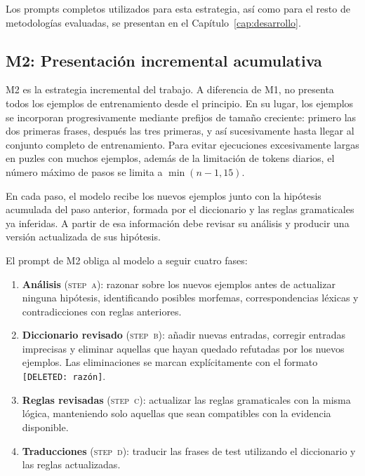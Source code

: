 Los prompts completos utilizados para esta estrategia, así como para el resto de metodologías evaluadas, se presentan en el Capítulo~\ref{cap:desarrollo}.

\subsection{M2: Presentación incremental acumulativa}
\label{subsec:incremental}

M2 es la estrategia incremental del trabajo. A diferencia de M1, no presenta todos los ejemplos de entrenamiento desde el principio. En su lugar, los ejemplos se incorporan progresivamente mediante prefijos de tamaño creciente: primero las dos primeras frases, después las tres primeras, y así sucesivamente hasta llegar al conjunto completo de entrenamiento. Para evitar ejecuciones excesivamente largas en puzles con muchos ejemplos, además de la limitación de tokens diarios, el número máximo de pasos se limita a $\min(n-1, 15)$.

En cada paso, el modelo recibe los nuevos ejemplos junto con la hipótesis acumulada del paso anterior, formada por el diccionario y las reglas gramaticales ya inferidas. A partir de esa información debe revisar su análisis y producir una versión actualizada de sus hipótesis.

El prompt de M2 obliga al modelo a seguir cuatro fases:

\begin{enumerate}
	\item \textbf{Análisis} (\textsc{step~a}): razonar sobre los nuevos ejemplos antes de actualizar ninguna hipótesis, identificando posibles morfemas, correspondencias léxicas y contradicciones con reglas anteriores.
	
	\item \textbf{Diccionario revisado} (\textsc{step~b}): añadir nuevas entradas, corregir entradas imprecisas y eliminar aquellas que hayan quedado refutadas por los nuevos ejemplos. Las eliminaciones se marcan explícitamente con el formato \texttt{[DELETED: razón]}.
	
	\item \textbf{Reglas revisadas} (\textsc{step~c}): actualizar las reglas gramaticales con la misma lógica, manteniendo solo aquellas que sean compatibles con la evidencia disponible.
	
	\item \textbf{Traducciones} (\textsc{step~d}): traducir las frases de test utilizando el diccionario y las reglas actualizadas.
\end{enumerate}

